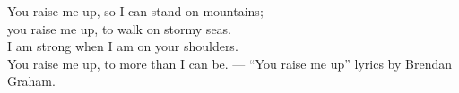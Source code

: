 \noindent You raise me up, so I can stand on mountains;\\
you raise me up, to walk on stormy seas.\\
I am strong when I am on your shoulders.\\
You raise me up, to more than I can be. --- ``You raise me up'' lyrics by Brendan Graham.\\

